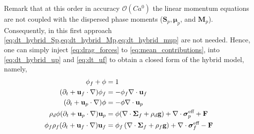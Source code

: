 Remark that at this order in accuracy $\mathcal{O}(Ca^0)$ the linear momentum equations are not coupled with the dispersed phase moments ($\textbf{S}_p,\bm\mu_p$, and $\textbf{M}_p$).  
Consequently, in this first approach \ref{eq:dt_hybrid_Sp,eq:dt_hybrid_Mp,eq:dt_hybrid_mup} are not needed.
Hence, one can simply inject \ref{eq:drag_forces} to \ref{eq:mean_contributions}, into  \ref{eq:dt_hybrid_up} and \ref{eq:dt_uf} to obtain a closed form of the hybrid model, namely,  
\begin{align}
    \label{eq:first}
    \phi_f + \phi &= 1\\
    (\pddt + \textbf{u}_f  \cdot \grad) \phi_f
    &= - \phi_f \div \textbf{u}_f\\
    (\pddt + \textbf{u}_p \cdot \grad)\phi
    &=
    - \phi \div \textbf{u}_p\\
    \rho_d \phi (\pddt + \textbf{u}_p \cdot \grad)\textbf{u}_p
    &=
    \phi(\div \bm\Sigma_f
    + \rho_d  \textbf{g})
    + \div \bm\sigma_p^\text{eff}
    + \textbf{F}
    \\
    \phi_f \rho_f(\pddt + \textbf{u}_f  \cdot \grad) \textbf{u}_f
    &= \phi_f 
    \left(\div \bm{\Sigma}_f
    + \rho_f \textbf{g}\right)
    + \div \bm\sigma_f^\text{eff}
    -\textbf{F}\\
    \label{eq:last}
\end{align}
